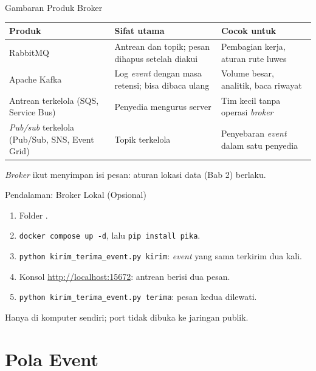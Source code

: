 \documentclass[aspectratio=169, table, 12pt]{beamer}
\begin{document}
\begin{frame}{{\Large Gambaran Produk Broker}}
  \footnotesize
  \begin{tabularx}{\textwidth}{>{\raggedright\arraybackslash}p{3.6cm}
      >{\raggedright\arraybackslash}X >{\raggedright\arraybackslash}X}
    \hline
    \textbf{Produk} & \textbf{Sifat utama} & \textbf{Cocok untuk} \\
    \hline
    RabbitMQ & Antrean dan topik; pesan dihapus setelah diakui
      & Pembagian kerja, aturan rute luwes \\
    \hline
    Apache Kafka & Log \textit{event} dengan masa retensi; bisa dibaca ulang
      & Volume besar, analitik, baca riwayat \\
    \hline
    Antrean terkelola (SQS, Service Bus) & Penyedia mengurus server
      & Tim kecil tanpa operasi \textit{broker} \\
    \hline
    \textit{Pub/sub} terkelola (Pub/Sub, SNS, Event Grid) & Topik terkelola
      & Penyebaran \textit{event} dalam satu penyedia \\
    \hline
  \end{tabularx}

  \vspace{10pt}
  \small
  \textit{Broker} ikut menyimpan isi pesan: aturan lokasi data (Bab 2) berlaku.
\end{frame}

\begin{frame}{{\Large Pendalaman: Broker Lokal (Opsional)}}
  \vspace{4pt}
  \small
  \begin{enumerate}
    \item Folder .
    \item \texttt{docker compose up -d}, lalu \texttt{pip install pika}.
    \item \texttt{python kirim\_terima\_event.py kirim}: \textit{event} yang
          sama terkirim dua kali.
    \item Konsol \url{http://localhost:15672}: antrean berisi dua pesan.
    \item \texttt{python kirim\_terima\_event.py terima}: pesan kedua dilewati.
  \end{enumerate}
  \vspace{4pt}
  {\footnotesize Hanya di komputer sendiri; port tidak dibuka ke jaringan
  publik.}
\end{frame}

\section{Pola Event}
\end{document}
